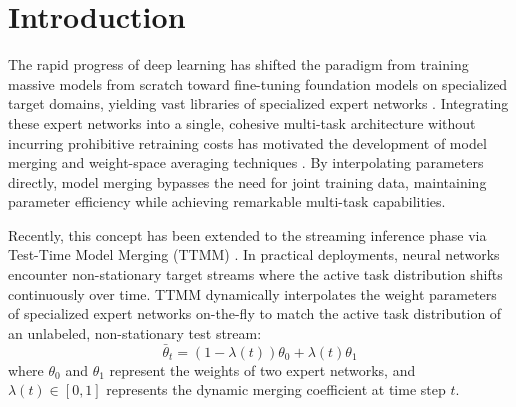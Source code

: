 \documentclass{article}
\theoremstyle{plain}
\theoremstyle{definition}
\theoremstyle{remark}
\begin{document}
\section{Introduction}
\label{sec:intro}
The rapid progress of deep learning has shifted the paradigm from training massive models from scratch toward fine-tuning foundation models on specialized target domains, yielding vast libraries of specialized expert networks \cite{wortsman22soups}. Integrating these expert networks into a single, cohesive multi-task architecture without incurring prohibitive retraining costs has motivated the development of model merging and weight-space averaging techniques \cite{ilharco2023editing,yadav2023ties}. By interpolating parameters directly, model merging bypasses the need for joint training data, maintaining parameter efficiency while achieving remarkable multi-task capabilities.

Recently, this concept has been extended to the streaming inference phase via Test-Time Model Merging (TTMM) \cite{yang2024ttmm,hubotter2026ttmm}. In practical deployments, neural networks encounter non-stationary target streams where the active task distribution shifts continuously over time. TTMM dynamically interpolates the weight parameters of specialized expert networks on-the-fly to match the active task distribution of an unlabeled, non-stationary test stream:
\begin{equation}
\bar{\theta}_t = (1 - \lambda(t))\theta_0 + \lambda(t)\theta_1
\end{equation}
where $\theta_0$ and $\theta_1$ represent the weights of two expert networks, and $\lambda(t) \in [0, 1]$ represents the dynamic merging coefficient at time step $t$.
\end{document}
